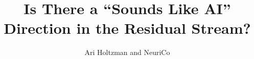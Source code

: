 \documentclass{article}
\title{Is There a ``Sounds Like AI'' Direction in the Residual Stream?}
\author{Ari Holtzman and NeuriCo}
\begin{document}
\maketitle

\begin{abstract}

\end{abstract}










\end{document}
